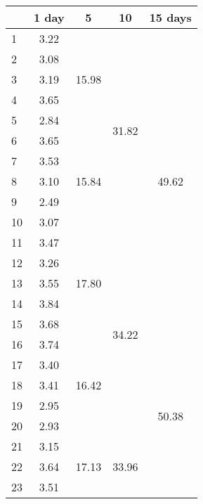 \begin{center}
\begin{tabular}{| l || c | c | c | c |}\hline
 & 1 day & 5 & 10 & 15 days \\\hline
1 & \multirow{1}{*}{ 3.22 }  & \multirow{5}{*}{ 15.98 }  & \multirow{10}{*}{ 31.82 }  & \multirow{15}{*}{ 49.62 }  \\\cline{2-2}
2 & \multirow{1}{*}{ 3.08 }  & & & \\\cline{2-2}
3 & \multirow{1}{*}{ 3.19 }  & & & \\\cline{2-2}
4 & \multirow{1}{*}{ 3.65 }  & & & \\\cline{2-2}
5 & \multirow{1}{*}{ 2.84 }  & & & \\\cline{2-2}\cline{3-3}
6 & \multirow{1}{*}{ 3.65 }  & \multirow{5}{*}{ 15.84 }  & & \\\cline{2-2}
7 & \multirow{1}{*}{ 3.53 }  & & & \\\cline{2-2}
8 & \multirow{1}{*}{ 3.10 }  & & & \\\cline{2-2}
9 & \multirow{1}{*}{ 2.49 }  & & & \\\cline{2-2}
10 & \multirow{1}{*}{ 3.07 }  & & & \\\cline{2-2}\cline{3-3}\cline{4-4}
11 & \multirow{1}{*}{ 3.47 }  & \multirow{5}{*}{ 17.80 }  & \multirow{10}{*}{ 34.22 }  & \\\cline{2-2}
12 & \multirow{1}{*}{ 3.26 }  & & & \\\cline{2-2}
13 & \multirow{1}{*}{ 3.55 }  & & & \\\cline{2-2}
14 & \multirow{1}{*}{ 3.84 }  & & & \\\cline{2-2}
15 & \multirow{1}{*}{ 3.68 }  & & & \\\cline{2-2}\cline{3-3}\cline{5-5}
16 & \multirow{1}{*}{ 3.74 }  & \multirow{5}{*}{ 16.42 }  & & \multirow{15}{*}{ 50.38 }  \\\cline{2-2}
17 & \multirow{1}{*}{ 3.40 }  & & & \\\cline{2-2}
18 & \multirow{1}{*}{ 3.41 }  & & & \\\cline{2-2}
19 & \multirow{1}{*}{ 2.95 }  & & & \\\cline{2-2}
20 & \multirow{1}{*}{ 2.93 }  & & & \\\cline{2-2}\cline{3-3}\cline{4-4}
21 & \multirow{1}{*}{ 3.15 }  & \multirow{5}{*}{ 17.13 }  & \multirow{10}{*}{ 33.96 }  & \\\cline{2-2}
22 & \multirow{1}{*}{ 3.64 }  & & & \\\cline{2-2}
23 & \multirow{1}{*}{ 3.51 }  & & & \\\cline{2-2}

\end{tabular}
\end{center}
